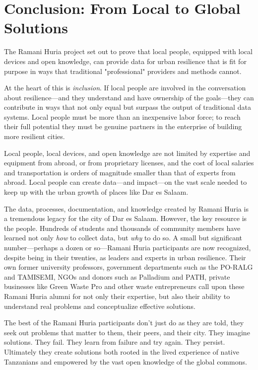 \documentclass[a4paper,12pt,twoside]{article}
\begin{document}
\section{Conclusion: From Local to Global Solutions}
\begin{multicols}{2}

The Ramani Huria project set out to prove that local people, equipped with local devices and open knowledge, can provide data for urban resilience that is fit for purpose in ways that traditional "professional" providers and methods cannot. 

At the heart of this is \textit{inclusion}. If local people are involved in the conversation about resilience---and they understand and have ownership of the goals---they can contribute in ways that not only equal but surpass the output of traditional data systems. Local people must be more than an inexpensive labor force; to reach their full potential they must be genuine partners in the enterprise of building more resilient cities.

Local people, local devices, and open knowledge are not limited by expertise and equipment from abroad, or from proprietary licenses, and the cost of local salaries and transportation is orders of magnitude smaller than that of experts from abroad. Local people can create data---and impact---on the vast scale needed to keep up with the urban growth of places like Dar es Salaam.

The data, processes, documentation, and knowledge created by Ramani Huria is a tremendous legacy for the city of Dar es Salaam. However, the key resource is the people. Hundreds of students and thousands of community members have learned not only \textit{how} to collect data, but \textit{why} to do so. A small but significant number---perhaps a dozen or so---Ramani Huria participants are now recognized, despite being in their twenties, as leaders and experts in urban resilience. Their own former university professors, government departments such as the PO-RALG and TAMISEMI, NGOs and donors such as Palladium and PATH, private businesses like Green Waste Pro and other waste entrepreneurs call upon these Ramani Huria alumni for not only their expertise, but also their ability to understand real problems and conceptualize effective solutions. 

The best of the Ramani Huria participants don't just do as they are told, they seek out problems that matter to them, their peers, and their city. They imagine solutions. They fail. They learn from failure and try again. They persist. Ultimately they create solutions both rooted in the lived experience of native Tanzanians and empowered by the vast open knowledge of the global commons. 


\end{multicols}
\end{document}
